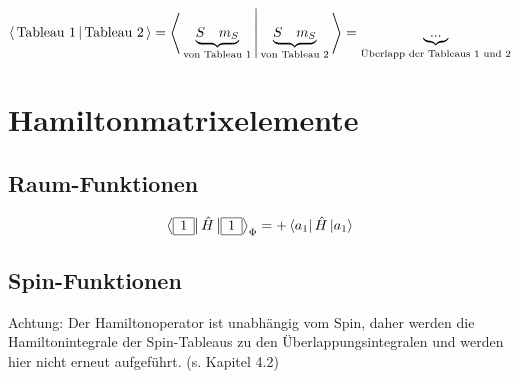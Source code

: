 \documentclass[fleqn]{article}%
\newcommand{\checkpagebreak}{\needspace{.25\textheight}}%
\begin{document}
%
\begin{dmath*}\bra{\,\text{Tableau 1}\,}\ket{\,\text{Tableau 2}\,} = \bra{\, \underbrace{S \quad m_S}_{\text{von Tableau 1}} \,} \ket{\, \underbrace{S \quad m_S}_{\text{von Tableau 2}} \,} = \underbrace{...}_{\text{Überlapp der Tableaus 1 und 2}}\end{dmath*}%
\vspace{0.25cm}%
\vspace{0.25cm}%
\vspace{0.25cm}%
\newpage%
\section{Hamiltonmatrixelemente}%
\label{sec:Hamiltonmatrixelemente}%

%
\subsection{Raum{-}Funktionen}%
\label{subsec:Raum{-}Funktionen}%

%
\vspace{0.25cm}%
\vspace{0.25cm}%
\begin{dmath*}\bra{\begin{array}{|c|} \hline 1\\ \cline{1-1} \end{array} }\hat{H}\ket{\begin{array}{|c|} \hline 1\\ \cline{1-1} \end{array} }_{\Phi} = + \bra{ a_{1} } \hat{H} \ket{ a_{1}}\end{dmath*}%
\vspace{0.25cm}%
\checkpagebreak%
\subsection{Spin{-}Funktionen}%
\label{subsec:Spin{-}Funktionen}%
Achtung: Der Hamiltonoperator ist unabhängig vom Spin, daher werden die Hamiltonintegrale der Spin-Tableaus zu den Überlappungsintegralen und werden hier nicht erneut aufgeführt. (s. Kapitel 4.2) 

%
\newpage%
\tableofcontents%
\thispagestyle{fancy}%
\end{document}
